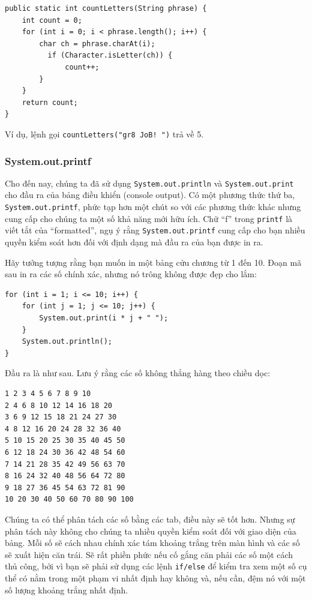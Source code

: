 \begin{verbatim}
public static int countLetters(String phrase) {
    int count = 0;
    for (int i = 0; i < phrase.length(); i++) {
        char ch = phrase.charAt(i);
          if (Character.isLetter(ch)) {
              count++;
        }
    }
    return count;
}
\end{verbatim}

Ví dụ, lệnh gọi \texttt{countLetters("gr8\ JoB!\ ")} trả về 5.

\subsubsection{System.out.printf}\label{system.out.printf}

Cho đến nay, chúng ta đã sử dụng \texttt{System.out.println} và
\texttt{System.out.print} cho đầu ra của bảng điều khiển (console
output). Có một phương thức thứ ba, \texttt{System.out.printf}, phức tạp
hơn một chút so với các phương thức khác nhưng cung cấp cho chúng ta một
số khả năng mới hữu ích. Chữ ``f'' trong \texttt{printf} là viết tắt của
``formatted'', ngụ ý rằng \texttt{System.out.printf} cung cấp cho bạn
nhiều quyền kiểm soát hơn đối với định dạng mà đầu ra của bạn được in
ra.

Hãy tưởng tượng rằng bạn muốn in một bảng cửu chương từ 1 đến 10. Đoạn
mã sau in ra các số chính xác, nhưng nó trông không được đẹp cho lắm:

\begin{verbatim}
for (int i = 1; i <= 10; i++) {
    for (int j = 1; j <= 10; j++) {
        System.out.print(i * j + " ");
    }
    System.out.println();
}
\end{verbatim}

Đầu ra là như sau. Lưu ý rằng các số không thẳng hàng theo chiều dọc:

\begin{verbatim}
1 2 3 4 5 6 7 8 9 10 
2 4 6 8 10 12 14 16 18 20 
3 6 9 12 15 18 21 24 27 30 
4 8 12 16 20 24 28 32 36 40 
5 10 15 20 25 30 35 40 45 50 
6 12 18 24 30 36 42 48 54 60 
7 14 21 28 35 42 49 56 63 70 
8 16 24 32 40 48 56 64 72 80 
9 18 27 36 45 54 63 72 81 90 
10 20 30 40 50 60 70 80 90 100
\end{verbatim}

Chúng ta có thể phân tách các số bằng các tab, điều này sẽ tốt hơn.
Nhưng sự phân tách này không cho chúng ta nhiều quyền kiểm soát đối với
giao diện của bảng. Mỗi số sẽ cách nhau chính xác tám khoảng trắng trên
màn hình và các số sẽ xuất hiện căn trái. Sẽ rất phiền phức nếu cố gắng
căn phải các số một cách thủ công, bởi vì bạn sẽ phải sử dụng các lệnh
\texttt{if/else} để kiểm tra xem một số cụ thể có nằm trong một phạm vi
nhất định hay không và, nếu cần, đệm nó với một số lượng khoảng trắng
nhất định.

